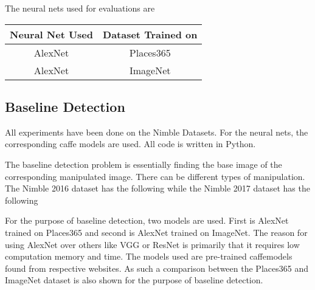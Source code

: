 \documentclass{article}
\begin{document}
The neural nets used for evaluations are
\begin{center}
  \begin{tabular}{|c|c|}
    \hline
    Neural Net Used & Dataset Trained on \\
    \hline
    AlexNet & Places365 \\
    \hline
    AlexNet & ImageNet \\
    \hline
  \end{tabular}
\end{center}
\subsection{Baseline Detection}
All experiments have been done on the Nimble Datasets. For the neural nets, the corresponding caffe models are used. All code is written in Python.

The baseline detection problem is essentially finding the base image of the corresponding manipulated image. There can be different types of manipulation. The Nimble 2016 dataset has the following
while the Nimble 2017 dataset has the following

For the purpose of baseline detection, two models are used. First is AlexNet trained on Places365 and second is AlexNet trained on ImageNet. The reason for using AlexNet over others like VGG or ResNet is primarily that it requires low computation memory and time. The models used are pre-trained caffemodels found from respective websites. %
As such a comparison between the Places365 and ImageNet dataset is also shown for the purpose of baseline detection.
\end{document}
